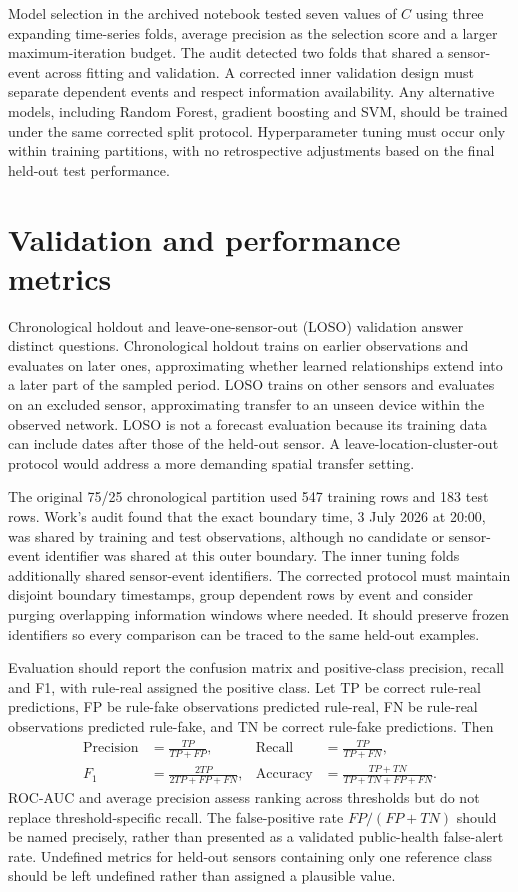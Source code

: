 \documentclass[12pt,a4paper,oneside]{report}
\begin{document}
Model selection in the archived notebook tested seven values of $C$ using three expanding time-series folds, average precision as the selection score and a larger maximum-iteration budget. The audit detected two folds that shared a sensor-event across fitting and validation. A corrected inner validation design must separate dependent events and respect information availability. Any alternative models, including Random Forest, gradient boosting and SVM, should be trained under the same corrected split protocol. Hyperparameter tuning must occur only within training partitions, with no retrospective adjustments based on the final held-out test performance.

\section{Validation and performance metrics}
Chronological holdout and leave-one-sensor-out (LOSO) validation answer distinct questions. Chronological holdout trains on earlier observations and evaluates on later ones, approximating whether learned relationships extend into a later part of the sampled period. LOSO trains on other sensors and evaluates on an excluded sensor, approximating transfer to an unseen device within the observed network. LOSO is not a forecast evaluation because its training data can include dates after those of the held-out sensor. A leave-location-cluster-out protocol would address a more demanding spatial transfer setting.

The original 75/25 chronological partition used 547 training rows and 183 test rows. Work's audit found that the exact boundary time, 3 July 2026 at 20:00, was shared by training and test observations, although no candidate or sensor-event identifier was shared at this outer boundary. The inner tuning folds additionally shared sensor-event identifiers. The corrected protocol must maintain disjoint boundary timestamps, group dependent rows by event and consider purging overlapping information windows where needed. It should preserve frozen identifiers so every comparison can be traced to the same held-out examples.

Evaluation should report the confusion matrix and positive-class precision, recall and F1, with rule-real assigned the positive class. Let TP be correct rule-real predictions, FP be rule-fake observations predicted rule-real, FN be rule-real observations predicted rule-fake, and TN be correct rule-fake predictions. Then
\begin{align}\text{Precision}&=\frac{TP}{TP+FP},&\text{Recall}&=\frac{TP}{TP+FN},\\
F_1&=\frac{2TP}{2TP+FP+FN},&\text{Accuracy}&=\frac{TP+TN}{TP+TN+FP+FN}.
\end{align}
ROC-AUC and average precision assess ranking across thresholds but do not replace threshold-specific recall. The false-positive rate $FP/(FP+TN)$ should be named precisely, rather than presented as a validated public-health false-alert rate. Undefined metrics for held-out sensors containing only one reference class should be left undefined rather than assigned a plausible value.
\end{document}
